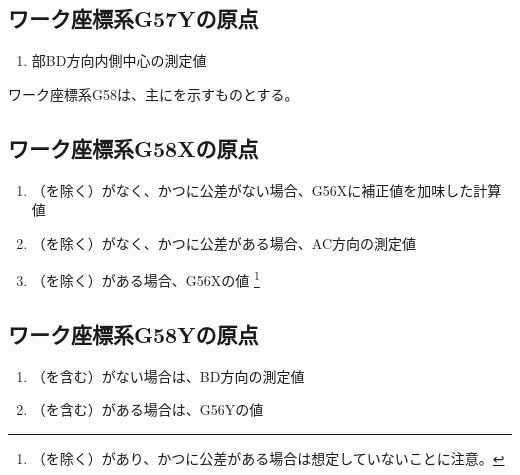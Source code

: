 \subsection{ワーク座標系{\ttfamily G57Y}の原点}
\begin{enumerate}[label*=\sarrow]
\item \TopEndFace 部BD方向内側中心の測定値
\end{enumerate}



\clearpage
ワーク座標系{\ttfamily G58}は、主に\KeywayCenter を示すものとする。


\subsection{ワーク座標系{\ttfamily G58X}の原点}
\begin{enumerate}[label*=\sarrow]
\item \TopOutcut（\TopCurvedOutcut を除く）がなく、かつ\AsideKeywayDepth に公差がない場合、{\ttfamily G56X}に補正値を加味した計算値
\item \TopOutcut（\TopCurvedOutcut を除く）がなく、かつ\AsideKeywayDepth に公差がある場合、AC方向\KeywayCenter の測定値
\item \TopOutcut（\TopCurvedOutcut を除く）がある場合、{\ttfamily G56X}の値
\footnote{\TopOutcut（\TopCurvedOutcut を除く）があり、かつ\AsideKeywayDepth に公差がある場合は想定していないことに注意。}
\end{enumerate}


\subsection{ワーク座標系{\ttfamily G58Y}の原点}
\begin{enumerate}[label*=\sarrow]
\item \TopOutcut（\TopCurvedOutcut を含む）がない場合は、BD方向\KeywayCenter の測定値
\item \TopOutcut（\TopCurvedOutcut を含む）がある場合は、{\ttfamily G56Y}の値
\end{enumerate}



